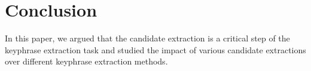 
\section{Conclusion}
\label{sec:conclusion}
  In this paper, we argued that the candidate extraction is a critical step of
  the keyphrase extraction task and studied the impact of various candidate
  extractions over different keyphrase extraction methods.


